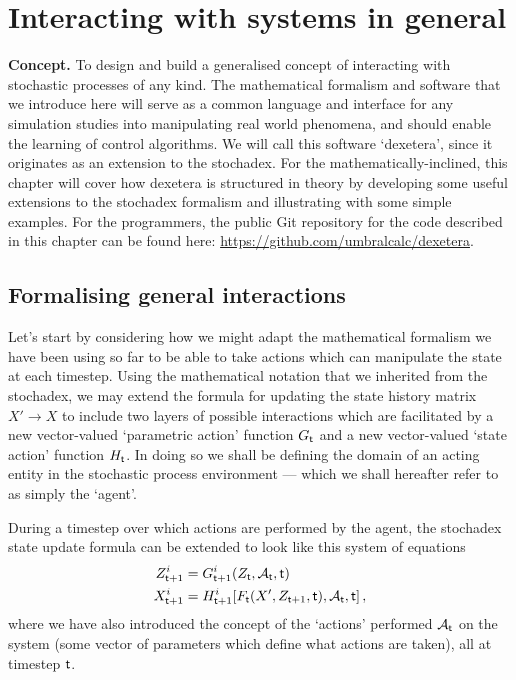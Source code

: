 \chapter{\sffamily Interacting with systems in general}

{\bfseries\sffamily Concept.} To design and build a generalised concept of interacting with stochastic processes of any kind. The mathematical formalism and software that we introduce here will serve as a common language and interface for any simulation studies into manipulating real world phenomena, and should enable the learning of control algorithms. We will call this software `dexetera', since it originates as an extension to the stochadex. For the mathematically-inclined, this chapter will cover how dexetera is structured in theory by developing some useful extensions to the stochadex formalism and illustrating with some simple examples. For the programmers, the public Git repository for the code described in this chapter can be found here: \href{https://github.com/umbralcalc/dexetera}{https://github.com/umbralcalc/dexetera}.

\section{\sffamily Formalising general interactions}

Let's start by considering how we might adapt the mathematical formalism we have been using so far to be able to take actions which can manipulate the state at each timestep. Using the mathematical notation that we inherited from the stochadex, we may extend the formula for updating the state history matrix $X'\rightarrow X$ to include two layers of possible interactions which are facilitated by a new vector-valued `parametric action' function $G_{{\sf t}}$ and a new vector-valued `state action' function $H_{{\sf t}}$. In doing so we shall be defining the domain of an acting entity in the stochastic process environment --- which we shall hereafter refer to as simply the `agent'.

During a timestep over which actions are performed by the agent, the stochadex state update formula can be extended to look like this system of equations
\begin{align}
Z_{{\sf t}+1}^i &= G_{{\sf t}+1}^i(Z_{{\sf t}}, {\cal A}_{{\sf t}}, {\sf t}) \label{eq:generalised-param-actions} \\
X_{{\sf t}+1}^i &= H^i_{{\sf t}+1}[F_{\sf t}(X', Z_{{\sf t}+1}, {\sf t}), {\cal A}_{\sf t}, {\sf t}] \label{eq:generalised-state-actions} \,,
\end{align}
where we have also introduced the concept of the `actions' performed ${\cal A}_{{\sf t}}$ on the system (some vector of parameters which define what actions are taken), all at timestep ${\sf t}$.

